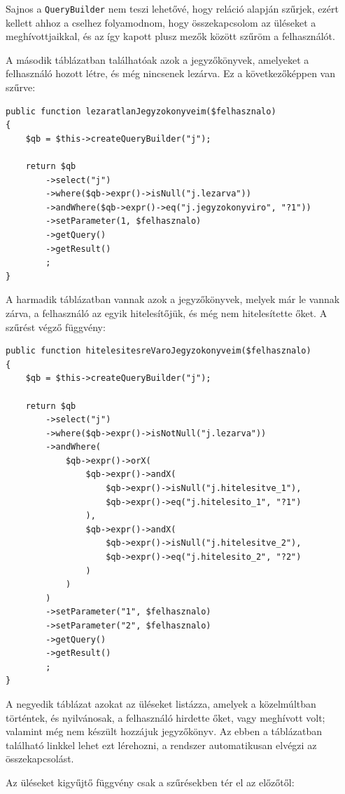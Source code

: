 \documentclass[a4paper,12pt,oneside]{report}
\begin{document}
Sajnos a {\tt QueryBuilder} nem teszi lehetővé, hogy reláció alapján szűrjek, ezért kellett ahhoz a cselhez folyamodnom, hogy összekapcsolom az üléseket a meghívottjaikkal, és az így kapott plusz mezők között szűröm a felhasználót.

A második táblázatban találhatóak azok a jegyzőkönyvek, amelyeket a felhasználó hozott létre, és még nincsenek lezárva. Ez a következőképpen van szűrve:

\begin{lstlisting}
public function lezaratlanJegyzokonyveim($felhasznalo)
{
    $qb = $this->createQueryBuilder("j");

    return $qb
        ->select("j")
        ->where($qb->expr()->isNull("j.lezarva"))
        ->andWhere($qb->expr()->eq("j.jegyzokonyviro", "?1"))
        ->setParameter(1, $felhasznalo)
        ->getQuery()
        ->getResult()
        ;
}
\end{lstlisting}

A harmadik táblázatban vannak azok a jegyzőkönyvek, melyek már le vannak zárva, a felhasználó az egyik hitelesítőjük, és még nem hitelesítette őket. A szűrést végző függvény:

\begin{lstlisting}
public function hitelesitesreVaroJegyzokonyveim($felhasznalo)
{
    $qb = $this->createQueryBuilder("j");

    return $qb
        ->select("j")
        ->where($qb->expr()->isNotNull("j.lezarva"))
        ->andWhere(
            $qb->expr()->orX(
                $qb->expr()->andX(
                    $qb->expr()->isNull("j.hitelesitve_1"),
                    $qb->expr()->eq("j.hitelesito_1", "?1")
                ),
                $qb->expr()->andX(
                    $qb->expr()->isNull("j.hitelesitve_2"),
                    $qb->expr()->eq("j.hitelesito_2", "?2")
                )
            )
        )
        ->setParameter("1", $felhasznalo)
        ->setParameter("2", $felhasznalo)
        ->getQuery()
        ->getResult()
        ;
}
\end{lstlisting}

A negyedik táblázat azokat az üléseket listázza, amelyek a közelmúltban történtek, és nyilvánosak, a felhasználó hirdette őket, vagy meghívott volt; valamint még nem készült hozzájuk jegyzőkönyv. Az ebben a táblázatban található linkkel lehet ezt lérehozni, a rendszer automatikusan elvégzi az összekapcsolást.

Az üléseket kigyűjtő függvény csak a szűrésekben tér el az előzőtől:
\end{document}
